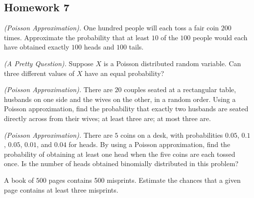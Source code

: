 \subsection{Homework 7}
\begin{problem}[Handout 10, \# 4]
  \emph{(Poisson Approximation).} One hundred people will each toss a fair
  coin \(200\) times. Approximate the probability that at least \(10\) of
  the \(100\) people would each have obtained exactly \(100\) heads and
  \(100\) tails.
\end{problem}
\begin{solution*}
\end{solution*}

\begin{problem}[Handout 10, \# 5]
  \emph{(A Pretty Question).} Suppose \(X\) is a Poisson distributed random
  variable. Can three different values of \(X\) have an equal probability?
\end{problem}
\begin{solution*}

\end{solution*}

\begin{problem}[Handout 10, \# 6]
  \emph{(Poisson Approximation).} There are \(20\) couples seated at a
  rectangular table, husbands on one side and the wives on the other, in a
  random order. Using a Poisson approximation, find the probability that
  exactly two husbands are seated directly across from their wives; at
  least three are; at most three are.
\end{problem}
\begin{solution*}

\end{solution*}

\begin{problem}[Handout 10, \# 7]
  \emph{(Poisson Approximation).} There are \(5\) coins on a desk, with
  probabilities \(0.05\), \(0.1\), \(0.05\), \(0.01\), and \(0.04\) for
  heads. By using a Poisson approximation, find the probability of
  obtaining at least one head when the five coins are each tossed once. Is
  the number of heads obtained binomially distributed in this problem?
\end{problem}
\begin{solution*}

\end{solution*}

\begin{problem}[Handout 10, \# 8]
  A book of \(500\) pages contains 500 misprints. Estimate the chances that
  a given page contains at least three misprints.
\end{problem}
\begin{solution*}

\end{solution*}

